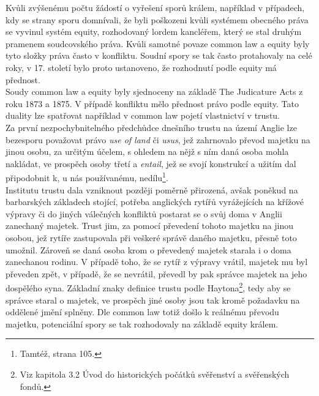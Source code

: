 \documentclass{article}
\begin{document}

Kvůli zvýšenému počtu žádostí o vyřešení sporů králem, například v případech, kdy se strany sporu domnívali, že byli poškozeni kvůli systémem obecného práva se vyvinul systém equity, rozhodovaný lordem kancléřem, který se stal druhým pramenem soudcovského práva. Kvůli samotné povaze common law a equity byly tyto složky práva často v konfliktu. Soudní spory se tak často protahovaly na celé roky, v 17. století bylo proto ustanoveno, že rozhodnutí podle equity má přednost.\\

Soudy common law a equity byly sjednoceny na základě The Judicature Acts z roku 1873 a 1875. V případě konfliktu mělo přednost právo podle equity. Tato duality lze spatřovat například v common law pojetí vlastnictví v trustu.\\

Za první nezpochybnitelného předchůdce dnešního trustu na území Anglie lze bezesporu považovat právo \textit{use of land} či \textit{usus}, jež zahrnovalo převod majetku na jinou osobu, za určitým účelem, s ohledem na nějž s ním daná osoba mohla nakládat, ve prospěch osoby třetí a \textit{entail}, jež se svojí konstrukcí a užitím dal připodobnit k, u nás používanému, nedílu\footnote{Tamtéž, strana 105.}. \\

Institutu trustu dala vzniknout později poměrně přirozená, avšak poněkud na barbarských základech stojící, potřeba anglických rytířů vyrážejících na křížové výpravy či do jiných válečných konfliktů postarat se o svůj doma v Anglii zanechaný majetek. Trust jim, za pomocí převedení tohoto majetku na jinou osobou, jež rytíře zastupovala při veškeré správě daného majetku, přesně toto umožnil. Zároveň se daná osoba krom o převedený majetek starala i o doma zanechanou rodinu. V případě toho, že se rytíř z výpravy vrátil, majetek mu byl převeden zpět, v případě, že se nevrátil, převedl by pak správce majetek na jeho dospělého syna. Základní znaky definice trustu podle Haytona\footnote{Viz kapitola 3.2 Úvod do historických počátků svěřenství a svěřenských fondů.}, tedy aby se správce staral o majetek, ve prospěch jiné osoby jsou tak kromě požadavku na oddělené jmění splněny. Dle common law totiž došlo k reálnému převodu majetku, potenciální spory se tak rozhodovaly na základě equity králem.\\
\end{document}

